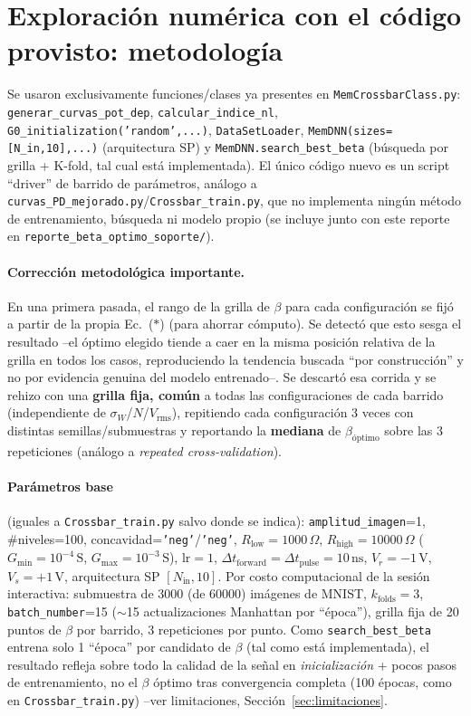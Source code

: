 \documentclass[11pt]{article}
\begin{document}
\section{Exploración numérica con el código provisto: metodología}
\label{sec:metodologia}

Se usaron exclusivamente funciones/clases ya presentes en \texttt{MemCrossbarClass.py}:
\texttt{generar\_curvas\_pot\_dep}, \texttt{calcular\_indice\_nl},
\texttt{G0\_initialization('random',...)}, \texttt{DataSetLoader},
\texttt{MemDNN(sizes=[N\_in,10],...)} (arquitectura SP) y
\texttt{MemDNN.search\_best\_beta} (búsqueda por grilla + K-fold, tal cual está
implementada). El único código nuevo es un script ``driver'' de barrido de
parámetros, análogo a \texttt{curvas\_PD\_mejorado.py}/\texttt{Crossbar\_train.py},
que no implementa ningún método de entrenamiento, búsqueda ni modelo propio (se
incluye junto con este reporte en \texttt{reporte\_beta\_optimo\_soporte/}).

\paragraph{Corrección metodológica importante.} En una primera pasada, el rango de
la grilla de $\beta$ para cada configuración se fijó a partir de la propia
Ec.~($\ast$) (para ahorrar cómputo). Se detectó que esto sesga el resultado --el
óptimo elegido tiende a caer en la misma posición relativa de la grilla en todos los
casos, reproduciendo la tendencia buscada ``por construcción'' y no por evidencia
genuina del modelo entrenado--. Se descartó esa corrida y se rehizo con una
\textbf{grilla fija, común} a todas las configuraciones de cada barrido
(independiente de $\sigma_W$/$N$/$V_{\text{rms}}$), repitiendo cada configuración
3 veces con distintas semillas/submuestras y reportando la \textbf{mediana} de
$\beta_{\text{óptimo}}$ sobre las 3 repeticiones (análogo a \emph{repeated
cross-validation}).

\paragraph{Parámetros base} (iguales a \texttt{Crossbar\_train.py} salvo donde se
indica): \texttt{amplitud\_imagen}=1, \#niveles=100, concavidad=\texttt{'neg'}/\texttt{'neg'},
$R_{\text{low}}=1000\,\Omega$, $R_{\text{high}}=10000\,\Omega$
($G_{\min}=10^{-4}\,\mathrm{S}$, $G_{\max}=10^{-3}\,\mathrm{S}$), $\mathrm{lr}=1$,
$\Delta t_{\text{forward}}=\Delta t_{\text{pulse}}=10\,\mathrm{ns}$, $V_r=-1\,\mathrm{V}$,
$V_s=+1\,\mathrm{V}$, arquitectura SP $[N_{\text{in}},10]$. Por costo computacional
de la sesión interactiva: submuestra de 3000 (de 60000) imágenes de MNIST,
$k_{\text{folds}}=3$, \texttt{batch\_number}=15 ($\sim$15 actualizaciones Manhattan
por ``época''), grilla fija de 20 puntos de $\beta$ por barrido, 3 repeticiones por
punto. Como \texttt{search\_best\_beta} entrena solo 1 ``época'' por candidato de
$\beta$ (tal como está implementada), el resultado refleja sobre todo la calidad de
la señal en \emph{inicialización} + pocos pasos de entrenamiento, no el $\beta$
óptimo tras convergencia completa (100 épocas, como en \texttt{Crossbar\_train.py})
--ver limitaciones, Sección~\ref{sec:limitaciones}.
\end{document}

